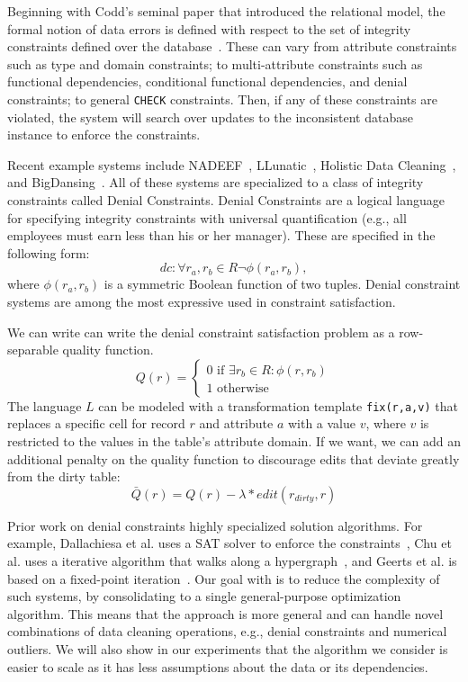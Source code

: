 Beginning with Codd's seminal paper that introduced the relational model, the formal notion of data errors is defined with respect to the set of integrity constraints defined over the database~\cite{codd1970relational}.   These can vary from attribute constraints such as type and domain constraints; to multi-attribute constraints such as functional dependencies, conditional functional dependencies, and denial constraints; to general \texttt{CHECK} constraints.   
Then, if any of these constraints are violated, the system will search over updates to the inconsistent database instance to enforce the constraints.

Recent example systems include NADEEF~\cite{DBLP:conf/sigmod/DallachiesaEEEIOT13}, LLunatic~\cite{geerts2013llunatic}, Holistic Data Cleaning~\cite{chu2013holistic}, and BigDansing~\cite{khayyat2015bigdansing}.
All of these systems are specialized to a class of integrity constraints called Denial Constraints.
Denial Constraints are a logical language for specifying integrity constraints with universal quantification (e.g., all employees must earn less than his or her manager).
These are specified in the following form:
\[
dc: \forall r_a, r_b \in R \neg \phi(r_a, r_b),
\]
where $\phi(r_a, r_b)$ is a symmetric Boolean function of two tuples.
Denial constraint systems are among the most expressive used in constraint satisfaction.

We can write can write the denial constraint satisfaction problem as a row-separable quality function.
\[Q(r) =
\begin{cases}
0 \text{ if } \exists r_b \in R : \phi(r, r_b) \\
1 \text{ otherwise}
\end{cases}\]
The language $L$ can be modeled with a transformation template \texttt{fix(r,a,v)} that replaces a specific cell for record $r$ and attribute $a$ with a value $v$, where $v$ is restricted to the values in the table's attribute domain.
If we want, we can add an additional penalty on the quality function to discourage edits that deviate greatly from the dirty table:
\[\bar{Q}(r) = Q(r) - \lambda * edit(r_{dirty}, r)\]

Prior work on denial constraints highly specialized solution algorithms.
For example, Dallachiesa et al. uses a SAT solver to enforce the constraints~\cite{DBLP:conf/sigmod/DallachiesaEEEIOT13}, Chu et al. uses a iterative algorithm that walks along a hypergraph~\cite{chu2013holistic}, and Geerts et al. is based on a fixed-point iteration~\cite{geerts2013llunatic}.
Our goal with \sys is to reduce the complexity of such systems, by consolidating to a single general-purpose optimization algorithm.
This means that the approach is more general and can handle novel combinations of data cleaning operations, e.g., denial constraints and numerical outliers.
We will also show in our experiments that the algorithm we consider is easier to scale as it has less assumptions about the data or its dependencies.

